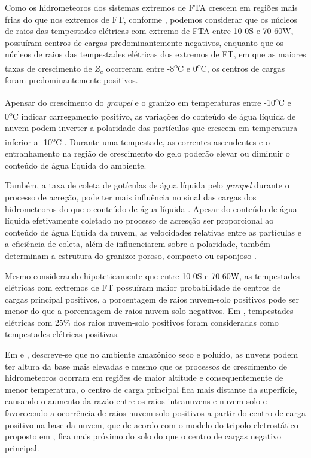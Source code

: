 Como os hidrometeoros dos sistemas extremos de FTA crescem em regiões mais frias do que nos extremos de FT,
conforme , podemos considerar que os núcleos de raios das tempestades elétricas com extremo de FTA entre 10-0S e 70-60W, possuíram centros de cargas predominantemente negativos, enquanto que os núcleos de raios das tempestades elétricas dos extremos de FT, em que as maiores taxas de crescimento de $Z_c$ ocorreram entre  -8\textsuperscript{o}C e 0\textsuperscript{o}C, os centros de cargas foram predominantemente positivos.

Apensar do crescimento do \textit{graupel} e o granizo em temperaturas entre -10\textsuperscript{o}C e 0\textsuperscript{o}C indicar carregamento positivo, as variações do conteúdo de água líquida de nuvem  podem inverter a polaridade das partículas que crescem em temperatura inferior a -10\textsuperscript{o}C \cite{Takahashi1978}. Durante uma tempestade, as correntes ascendentes e o entranhamento na região de crescimento do gelo poderão elevar ou diminuir o conteúdo de água líquida do ambiente.

Também, a taxa de coleta de gotículas de água líquida pelo \textit{graupel} durante o processo de acreção, pode ter mais influência no sinal das cargas dos hidrometeoros do que o conteúdo de água líquida \cite{jayaratne1983,saunders1991effect,brooks1997,Takahashi2002}. 
Apesar do conteúdo de água líquida efetivamente coletado no processo de acresção ser proporcional ao conteúdo de água líquida da nuvem, as velocidades relativas entre as partículas e a eficiência de coleta, além de influenciarem sobre a polaridade, também determinam a estrutura do granizo: poroso, compacto ou esponjoso \cite[p.~335]{mason1971_2ed}.  
 
Mesmo considerando hipoteticamente que entre 10-0S e 70-60W, as tempestades elétricas com extremos de FT possuíram maior probabilidade de centros de cargas principal positivos, a porcentagem de raios nuvem-solo  positivos pode ser menor do que a porcentagem de raios nuvem-solo negativos. Em , tempestades elétricas com 25\% dos raios nuvem-solo positivos foram consideradas como tempestades elétricas positivas.

Em  e , descreve-se que no ambiente amazônico seco e poluído, as nuvens podem ter altura da base mais elevadas e mesmo que os processos de crescimento de hidrometeoros ocorram em regiões de maior altitude e consequentemente de menor temperatura, o centro de carga principal fica mais distante da superfície, causando  o aumento da razão entre os raios intranuvens e nuvem-solo e favorecendo a ocorrência de raios nuvem-solo positivos a partir do centro de carga positivo na base da nuvem, que de acordo com o modelo do tripolo eletrostático proposto em , fica mais próximo do solo do que o centro de cargas negativo principal.

